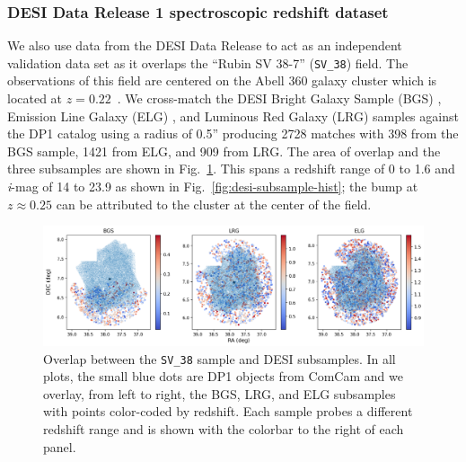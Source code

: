 \subsubsection{DESI Data Release 1 spectroscopic redshift dataset}
\label{sec:data:desi}


We also use data from the DESI Data Release \citep{desi-dr1} to act as an independent validation data set as it overlaps the ``Rubin SV 38-7'' (\texttt{SV\_38}) field.
The observations of this field are centered on the Abell 360 galaxy cluster which is located at $z=0.22$~\citep{A360z}.
We cross-match the DESI Bright Galaxy Sample (BGS) \citep{BGS}, Emission Line Galaxy (ELG) \citep{ELG}, and Luminous Red Galaxy (LRG) \citep{LRG} samples against the DP1 catalog using a radius of 0.5'' producing 2728  matches with 398 from the BGS sample, 1421 from ELG, and 909 from LRG.
The area of overlap and the three subsamples are shown in Fig.~\ref{fig:desi-overlap}.
This spans a redshift range of 0 to 1.6 and \textit{i}-mag of 14 to 23.9 as shown in Fig.~\ref{fig:desi-subsample-hist}; the bump at $z\approx0.25$ can be attributed to the cluster at the center of the field.


\begin{figure}
    \centering
    \includegraphics[width=\linewidth]{figures/desi_sample_overlap.png}
    \caption{Overlap between the \texttt{SV\_38} sample and DESI subsamples. In all plots, the small blue dots are DP1 objects from ComCam and we overlay, from left to right, the BGS, LRG, and ELG subsamples with points color-coded by redshift. Each sample probes a different redshift range and is shown with the colorbar to the right of each panel.}
    \label{fig:desi-overlap}
\end{figure}

